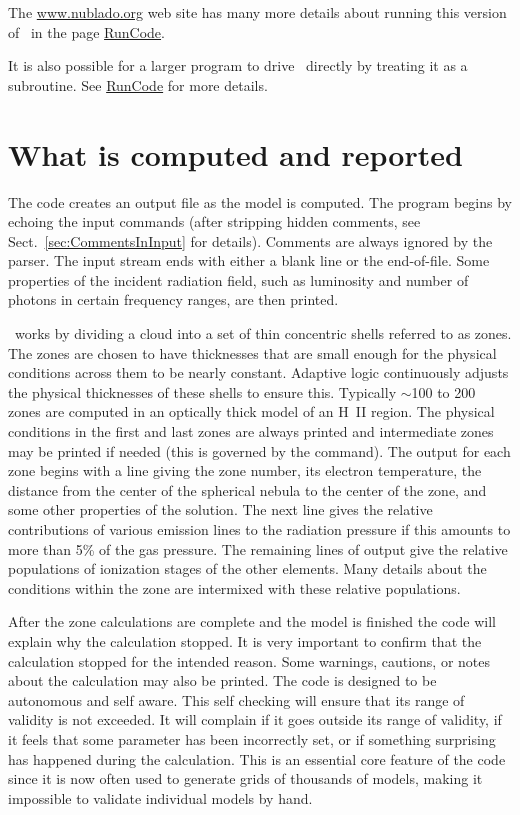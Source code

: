 The \href{http://www.nublado.org}{www.nublado.org} web site has many more details
about running this version of \Cloudy\ in the page
\href{https://gitlab.nublado.org/cloudy/cloudy/-/wikis/RunCode}{RunCode}.

It is also possible for a larger program to drive \Cloudy\ directly by
treating it as a subroutine. 
See \href{https://gitlab.nublado.org/cloudy/cloudy/-/wikis/RunCode}{RunCode} for more details.

\section{What is computed and reported}

The code creates an output file as the model is computed.
The program begins by echoing the input commands (after stripping hidden
comments, see Sect.~\ref{sec:CommentsInInput} for details).  Comments are
always ignored by the parser.  The input stream ends with either a blank line or
the end-of-file.  Some properties of the incident radiation field, such
as luminosity and number of photons in certain frequency ranges, are then
printed.

\Cloudy\ works by dividing a cloud into a set of thin concentric shells
referred to as zones. The zones are chosen to have thicknesses that are
small enough for the physical conditions across them to be nearly constant.
Adaptive logic continuously adjusts the physical thicknesses of these shells
to ensure this.  Typically $\sim$100 to 200 zones are computed in an optically
thick model of an H~II region.  The physical conditions in the first and
last zones are always printed and intermediate zones may be printed if needed
(this is governed by the  command).
The output for each zone begins with a line giving the zone number, its
electron temperature, the distance from the center of the spherical nebula
to the center of the zone, and some other properties of the solution.  The
next line gives the relative contributions of various emission lines to
the radiation pressure if this amounts to more than 5\% of the gas pressure.
The remaining lines of output give the relative populations of
ionization stages of the other elements.
Many details about the conditions within the zone are
intermixed with these relative populations.

After the zone calculations are complete and the model is finished the
code will explain why the calculation stopped.  It is very important to
confirm that the calculation stopped for the intended reason.  Some warnings,
cautions, or notes about the calculation may also be printed.  The code
is designed to be autonomous and self aware.  This self checking will ensure
that its range of validity is not exceeded. It will complain if it goes
outside its range of validity, if it feels that some parameter has been
incorrectly set, or if something surprising has happened during the
calculation.  This is an essential core feature of the code since it is
now often used to generate grids of thousands of models, making it impossible
to validate individual models by hand.

